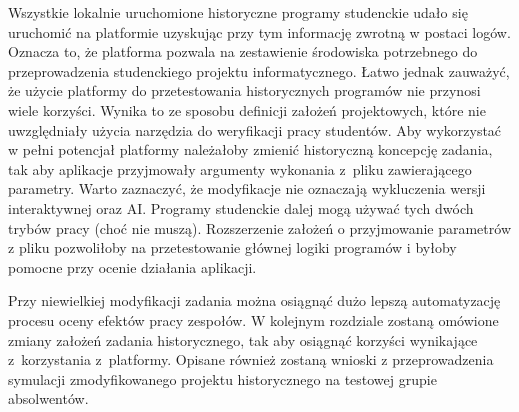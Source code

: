 Wszystkie lokalnie uruchomione historyczne programy studenckie udało się uruchomić na platformie uzyskując przy tym informację zwrotną w postaci logów.
Oznacza to, że platforma pozwala na zestawienie środowiska potrzebnego do przeprowadzenia studenckiego projektu informatycznego.
Łatwo jednak zauważyć, że użycie platformy do przetestowania historycznych programów nie przynosi wiele korzyści.
Wynika to ze sposobu definicji założeń projektowych, które nie uwzględniały użycia narzędzia do weryfikacji pracy studentów.
Aby wykorzystać w pełni potencjał platformy należałoby zmienić historyczną koncepcję zadania, tak aby aplikacje przyjmowały argumenty wykonania z~pliku zawierającego parametry.
Warto zaznaczyć, że modyfikacje nie oznaczają wykluczenia wersji interaktywnej oraz AI.
Programy studenckie dalej mogą używać tych dwóch trybów pracy (choć nie muszą).
Rozszerzenie założeń o przyjmowanie parametrów z pliku pozwoliłoby na przetestowanie głównej logiki programów i byłoby pomocne przy ocenie działania aplikacji.

Przy niewielkiej modyfikacji zadania można osiągnąć dużo lepszą automatyzację procesu oceny efektów pracy zespołów.
W kolejnym rozdziale zostaną omówione zmiany założeń zadania historycznego, tak aby osiągnąć korzyści wynikające z~korzystania z~platformy.
Opisane również zostaną wnioski z przeprowadzenia symulacji zmodyfikowanego projektu historycznego na testowej grupie absolwentów.





